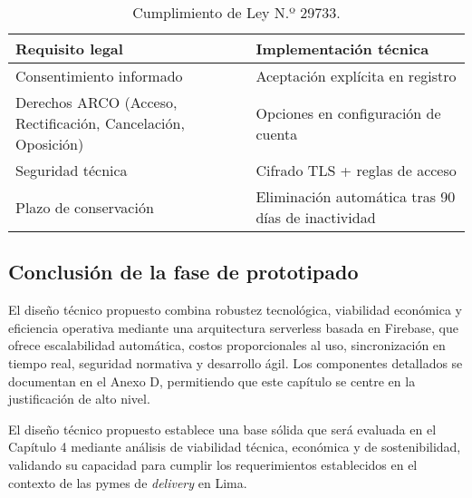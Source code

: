 \begin{table}[H]
\centering
\caption{Cumplimiento de Ley N.º 29733.}
\label{tab:cumplimiento_ley}
\begin{tabular}{@{}p{5.5cm}p{7.5cm}@{}}
\toprule
\textbf{Requisito legal} & \textbf{Implementación técnica} \\
\midrule
Consentimiento informado & Aceptación explícita en registro \\
\midrule
Derechos ARCO (Acceso, Rectificación, Cancelación, Oposición) & Opciones en configuración de cuenta \\
\midrule
Seguridad técnica & Cifrado TLS + reglas de acceso \\
\midrule
Plazo de conservación & Eliminación automática tras 90 días de inactividad \\
\bottomrule
\end{tabular}
\end{table}

\subsection{Conclusión de la fase de prototipado}

El diseño técnico propuesto combina robustez tecnológica, viabilidad económica y eficiencia operativa mediante una arquitectura serverless basada en Firebase, que ofrece escalabilidad automática, costos proporcionales al uso, sincronización en tiempo real, seguridad normativa y desarrollo ágil. Los componentes detallados se documentan en el Anexo D, permitiendo que este capítulo se centre en la justificación de alto nivel.

El diseño técnico propuesto establece una base sólida que será evaluada en el Capítulo 4 mediante análisis de viabilidad técnica, económica y de sostenibilidad, validando su capacidad para cumplir los requerimientos establecidos en el contexto de las pymes de \textit{delivery} en Lima.